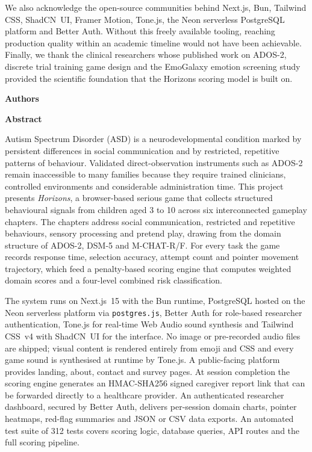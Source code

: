 \documentclass[12pt,a4paper,oneside]{report}
\newcommand{\fmheading}[1]{%
	\begin{center}
		{\fontsize{16}{24}\bfseries\selectfont #1}%
	\end{center}%
	\vspace{36pt}%
}
\begin{document}
	We also acknowledge the open-source communities behind Next.js, Bun, Tailwind CSS, ShadCN~UI, Framer Motion, Tone.js, the Neon serverless PostgreSQL platform and Better Auth. Without this freely available tooling, reaching production quality within an academic timeline would not have been achievable. Finally, we thank the clinical researchers whose published work on ADOS-2, discrete trial training game design and the EmoGalaxy emotion screening study provided the scientific foundation that the Horizons scoring model is built on.
	
	\vspace{18pt}
	\begin{flushright}
		{\fontsize{12}{18}\bfseries\selectfont Authors}
	\end{flushright}
	
	\clearpage
	\fmheading{Abstract}
	
	Autism Spectrum Disorder (ASD) is a neurodevelopmental condition marked by persistent differences in social communication and by restricted, repetitive patterns of behaviour. Validated direct-observation instruments such as ADOS-2 remain inaccessible to many families because they require trained clinicians, controlled environments and considerable administration time. This project presents \textit{Horizons}, a browser-based serious game that collects structured behavioural signals from children aged 3 to 10 across six interconnected gameplay chapters. The chapters address social communication, restricted and repetitive behaviours, sensory processing and pretend play, drawing from the domain structure of ADOS-2, DSM-5 and M-CHAT-R/F. For every task the game records response time, selection accuracy, attempt count and pointer movement trajectory, which feed a penalty-based scoring engine that computes weighted domain scores and a four-level combined risk classification.
	
	The system runs on Next.js~15 with the Bun runtime, PostgreSQL hosted on the Neon serverless platform via \texttt{postgres.js}, Better Auth for role-based researcher authentication, Tone.js for real-time Web Audio sound synthesis and Tailwind CSS~v4 with ShadCN~UI for the interface. No image or pre-recorded audio files are shipped; visual content is rendered entirely from emoji and CSS and every game sound is synthesised at runtime by Tone.js. A public-facing platform provides landing, about, contact and survey pages. At session completion the scoring engine generates an HMAC-SHA256 signed caregiver report link that can be forwarded directly to a healthcare provider. An authenticated researcher dashboard, secured by Better Auth, delivers per-session domain charts, pointer heatmaps, red-flag summaries and JSON or CSV data exports. An automated test suite of 312 tests covers scoring logic, database queries, API routes and the full scoring pipeline.
	
\end{document}
